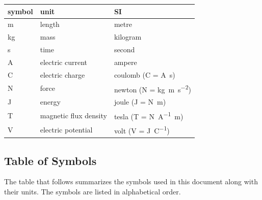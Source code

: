 \documentclass[12pt]{article}
\begin{document}
\renewcommand{\arraystretch}{1.2}
\noindent \begin{tabular}{l l l}
  \toprule
  \textbf{symbol} & \textbf{unit} & \textbf{SI}\\
  \midrule
  \unit{\metre}   & length  & metre\\
  \unit{\kilogram}& mass    & kilogram\\
  \unit{\second}  & time    & second\\
  \unit{\ampere}  & electric current & ampere\\
  \unit{\coulomb} & electric charge & coulomb (C = \unit{\ampere\second})\\
  \unit{\newton}  & force   & newton (N = \unit{\kilogram\metre\per\second\squared})\\
  \unit{\joule}   & energy  & joule (J = \unit{\newton\metre})\\
  \unit{\tesla}   & magnetic flux density & tesla (T = \unit{\newton\per\ampere\metre})\\
  \unit{\volt}    & electric potential & volt (V = \unit{\joule\per\coulomb})\\
  \bottomrule
\end{tabular}

\subsection{Table of Symbols}

The table that follows summarizes the symbols used in this document along with
their units. The symbols are listed in alphabetical order.
\end{document}
